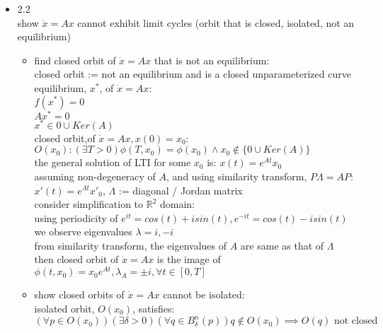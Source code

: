 \documentclass[12pt,letter]{article}
\newcommand{\R}{\mathbb{R}}
\begin{document}




\begin{itemize}
  
\item 2.2\\
  show $\dot{x}=Ax$ cannot exhibit limit cycles (orbit that is closed, isolated, not an equilibrium)
  \begin{itemize}
  \item find closed orbit of $\dot{x}=Ax$ that is not an equilibrium:\\
  closed orbit := not an equilibrium and is a closed unparameterized curve\\
  equilibrium, $x^*$, of $\dot{x}=Ax$:\\
  $f(x^*)=0$\\
  $Ax^*=0$\\
  $x^* \in 0 \cup Ker(A)$\\
  
  closed orbit,of $\dot{x}=Ax, x(0)=x_0$:\\
  $O(x_0): (\exists T > 0) \phi(T,x_0) = \phi(x_0) \wedge x_0 \notin \{0 \cup Ker(A)\}$\\
  the general solution of LTI for some $x_0$ is: $x(t)=e^{At}x_0$\\
  assuming non-degeneracy of $A$, and using similarity transform, $P\Lambda=AP$: \\
  $x'(t)=e^{\Lambda t} x'_0$, $\Lambda$ := diagonal / Jordan matrix\\
  consider simplification to $\R^2$ domain:\\
  using periodicity of $e^{it}=cos(t)+isin(t), e^{-it}=cos(t)-isin(t)$\\
  we observe eigenvalues $\lambda = i, -i$\\
  from similarity transform, the eigenvalues of $A$ are same as that of $\Lambda$\\
  then closed orbit of $\dot{x}=Ax$ is the image of $\phi(t,x_0)=x_0e^{At}, \lambda_A = \pm i, \forall t \in [0,T]$\\

  \item show closed orbits of $\dot{x}=Ax$ cannot be isolated:\\
  isolated orbit, $O(x_0)$, satisfies:\\
  $(\forall p \in O(x_0))(\exists \delta > 0)(\forall q \in B_{\delta}^n(p)) q \notin O(x_0) \implies O(q) \text{ not closed}$\\


\end{itemize}
\end{itemize}
\end{document}
